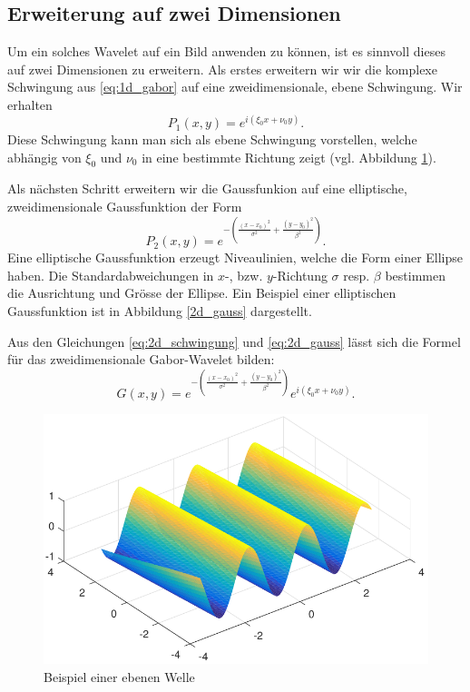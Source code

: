 \subsection{Erweiterung auf zwei Dimensionen}

Um ein solches Wavelet auf ein Bild anwenden zu können, ist es sinnvoll dieses auf zwei Dimensionen zu erweitern.
Als erstes erweitern wir wir die komplexe Schwingung aus \ref{eq:1d_gabor} auf eine zweidimensionale, ebene Schwingung.
Wir erhalten
\begin{equation}\label{eq:2d_schwingung}
P_1(x,y)= e^{i(\xi_{0}x+\nu_{0}y)}.
\end{equation}
Diese Schwingung kann man sich als ebene Schwingung vorstellen, welche abhängig von $\xi_0$ und $\nu_0$ in eine bestimmte Richtung zeigt (vgl. Abbildung \ref{fig:planarwave}).

Als nächsten Schritt erweitern wir die Gaussfunkion auf eine elliptische, zweidimensionale Gaussfunktion der Form
\begin{equation}\label{eq:2d_gauss}
P_2(x,y)=e^{-(\frac{(x-x_{0})^{2}}{\sigma^{2}}+\frac{(y-y_{0})^{2}}{\beta^{2}})}.
\end{equation}
Eine elliptische Gaussfunktion erzeugt Niveaulinien, welche die Form einer Ellipse haben.
Die Standardabweichungen in $x$-, bzw. $y$-Richtung $\sigma$ resp. $\beta$ bestimmen die Ausrichtung und Grösse der Ellipse.
Ein Beispiel einer elliptischen Gaussfunktion ist in Abbildung \ref{2d_gauss} dargestellt.

Aus den Gleichungen \ref{eq:2d_schwingung} und \ref{eq:2d_gauss} lässt sich die Formel für das zweidimensionale Gabor-Wavelet bilden:
\begin{equation}
G(x,y)= e^{-(\frac{(x-x_{0})^{2}}{\sigma^{2}}+\frac{(y-y_{0})^{2}}{\beta^{2}})}
e^{i(\xi_{0}x+\nu_{0}y)}.
\end{equation}

\begin{figure}
	\centering
	\includegraphics[width=0.7\linewidth]{./papers/visuell/images/planarwave.pdf}
	\caption{Beispiel einer ebenen Welle}
	\label{fig:planarwave}
\end{figure}

